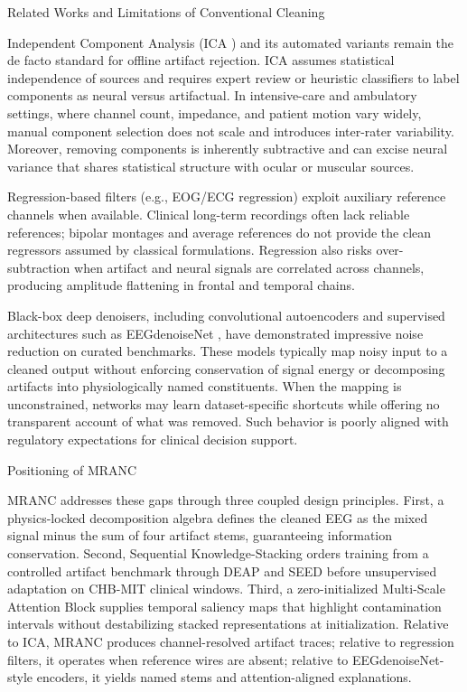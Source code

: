 \documentclass[journal,twocolumn]{IEEEtran}
\begin{document}
Related Works and Limitations of Conventional Cleaning

Independent Component Analysis \cite{makeig1997} (ICA \cite{makeig1997}) and its automated variants remain the de facto standard for offline artifact rejection. ICA assumes statistical independence of sources and requires expert review or heuristic classifiers to label components as neural versus artifactual. In intensive-care and ambulatory settings, where channel count, impedance, and patient motion vary widely, manual component selection does not scale and introduces inter-rater variability. Moreover, removing components is inherently subtractive and can excise neural variance that shares statistical structure with ocular or muscular sources.

Regression-based filters (e.g., EOG/ECG regression) exploit auxiliary reference channels when available. Clinical long-term recordings often lack reliable references; bipolar montages and average references do not provide the clean regressors assumed by classical formulations. Regression also risks over-subtraction when artifact and neural signals are correlated across channels, producing amplitude flattening in frontal and temporal chains.

Black-box deep denoisers, including convolutional autoencoders and supervised architectures such as EEGdenoiseNet \cite{zhang2022eegdenoisenet}, have demonstrated impressive noise reduction on curated benchmarks. These models typically map noisy input to a cleaned output without enforcing conservation of signal energy or decomposing artifacts into physiologically named constituents. When the mapping is unconstrained, networks may learn dataset-specific shortcuts while offering no transparent account of what was removed. Such behavior is poorly aligned with regulatory expectations for clinical decision support.

Positioning of MRANC

MRANC addresses these gaps through three coupled design principles. First, a physics-locked decomposition algebra defines the cleaned EEG as the mixed signal minus the sum of four artifact stems, guaranteeing information conservation. Second, Sequential Knowledge-Stacking orders training from a controlled artifact benchmark through DEAP and SEED before unsupervised adaptation on CHB-MIT \cite{shoeb2010chb} clinical windows. Third, a zero-initialized Multi-Scale Attention Block supplies temporal saliency maps that highlight contamination intervals without destabilizing stacked representations at initialization. Relative to ICA, MRANC produces channel-resolved artifact traces; relative to regression filters, it operates when reference wires are absent; relative to EEGdenoiseNet-style encoders, it yields named stems and attention-aligned explanations.
\end{document}
